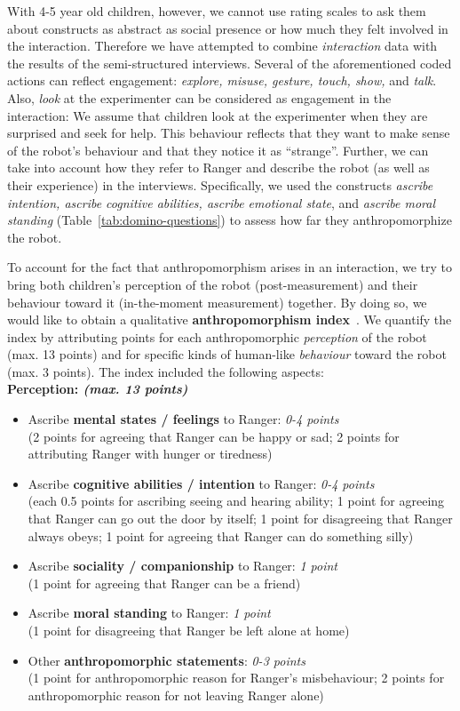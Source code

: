\documentclass{sig-alternate}
\begin{document}
With 4-5 year old children, however, we cannot use rating scales to ask them
about constructs as abstract as social presence or how much they felt involved
in the interaction. Therefore we have attempted to combine \emph{interaction}
data with the results of the semi-structured interviews.  Several of the
aforementioned coded actions can reflect engagement: \textit{explore, misuse,
gesture, touch, show,} and \textit{talk}. Also, \textit{look} at the
experimenter can be considered as engagement in the interaction: We assume that
children look at the experimenter when they are surprised and seek for help.
This behaviour reflects that they want to make sense of the robot's behaviour and
that they notice it as ``strange''. Further, we can take into account how they
refer to Ranger and describe the robot (as well as their experience) in the
interviews.  Specifically, we used the constructs \textit{ascribe intention,
    ascribe cognitive abilities, ascribe emotional state}, and \textit{ascribe
    moral standing} (Table~\ref{tab:domino-questions}) to assess how far they
    anthropomorphize the robot.

To account for the fact that anthropomorphism arises in an interaction, we try
to bring both children's perception of the robot (post-measurement) and their
behaviour toward it (in-the-moment measurement) together. By doing so, we would
like to obtain a qualitative \textbf{anthropomorphism
index}~\cite{fink2014dynamics}. We quantify the index by attributing points for each
anthropomorphic \emph{perception} of the robot (max.  13 points) and for specific kinds
of human-like \emph{behaviour} toward the robot (max.  3 points). The index included the
following aspects:\\

\textbf{Perception: \textit{(max. 13 points)}}
\begin{itemize}
	\item Ascribe \textbf{mental states / feelings} to Ranger: \textit{0-4 points}\\
	(2 points for agreeing that Ranger can be happy or sad; 2 points for attributing Ranger with hunger or tiredness)
	\item Ascribe \textbf{cognitive abilities / intention} to Ranger: \textit{0-4 points}\\ 
	(each 0.5 points for ascribing seeing and hearing ability; 1 point for agreeing that Ranger can go out the door by itself; 1 point for disagreeing that Ranger always obeys; 1 point for agreeing that Ranger can do something silly)
	\item Ascribe \textbf{sociality / companionship} to Ranger: \textit{1 point}\\ 
	(1 point for agreeing that Ranger can be a friend)
	\item Ascribe \textbf{moral standing} to Ranger: \textit{1 point}\\ (1 point for disagreeing that Ranger be left alone at home)
	\item Other \textbf{anthropomorphic statements}: \textit{0-3 points}\\ 
	(1 point for anthropomorphic reason for Ranger's misbehaviour; 2 points for anthropomorphic reason for not leaving Ranger alone) 
\end{itemize}
\end{document}
